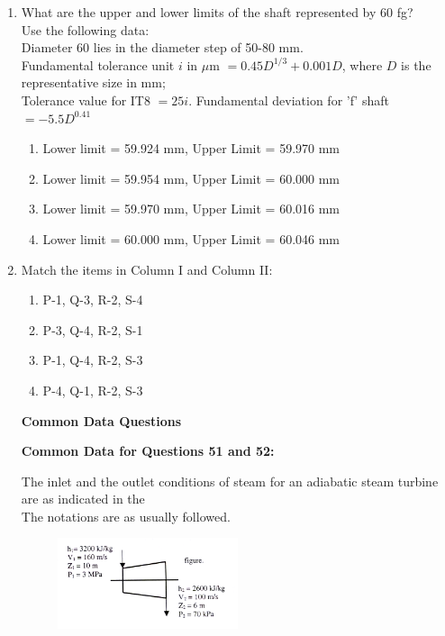 \documentclass[journal]{IEEEtran}
\begin{document}
\begin{enumerate}[leftmargin=0pt]
\item What are the upper and lower limits of the shaft represented by 60 fg?\\ Use the following data:
\\ Diameter 60 lies in the diameter step of 50-80 mm. \\
Fundamental tolerance unit $i$ in $\mu$m $= 0.45 D^{1/3} + 0.001 D$, where $D$ is the representative size in mm; \\
Tolerance value for IT8 $= 25i$. Fundamental deviation for 'f' shaft $= -5.5 D^{0.41}$
\begin{enumerate}
  \item Lower limit = 59.924 mm, Upper Limit = 59.970 mm
  \item Lower limit = 59.954 mm, Upper Limit = 60.000 mm
  \item Lower limit = 59.970 mm, Upper Limit = 60.016 mm
  \item Lower limit = 60.000 mm, Upper Limit = 60.046 mm
\hfill{}
\end{enumerate}

\item Match the items in Column I and Column II:\\
\begin{table}[h]
    \centering
    
   
\end{table}
\begin{enumerate}
  \item P-1, Q-3, R-2, S-4
  \item P-3, Q-4, R-2, S-1
  \item P-1, Q-4, R-2, S-3
  \item P-4, Q-1, R-2, S-3
  \hfill{}
\end{enumerate}

\textbf{Common Data Questions}

\textbf{Common Data for Questions 51 and 52:}

The inlet and the outlet conditions of steam for an adiabatic steam turbine are as indicated in the\\
The notations are as usually followed.
\begin{figure}[h]
  \centering
  \includegraphics[width=0.5\textwidth]{Figs/image (11).png}
  \caption{}
  \label{fig:50}
\end{figure}


\end{enumerate}
\end{document}
